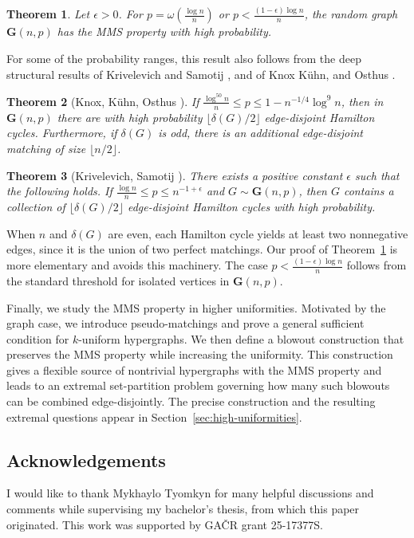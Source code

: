 \documentclass[12pt,UKenglish]{amsart}
\newtheorem{thm}{Theorem}[section]
\theoremstyle{plain}
\theoremstyle{definition}
\theoremstyle{remark}
\begin{document}
\begin{thm}\label{thm:random-graphs}
  Let $\epsilon>0$. For $p = \omega\left({\frac{\log n}{n}}\right)$ or $p<\frac{(1-\epsilon)\log n}{n}$, the random graph $\mathbf{G}(n,p)$ has the MMS property with high probability.
\end{thm}

For some of the probability ranges, this result also follows from the deep structural results of Krivelevich and Samotij \cite{krivelevich2012optimal}, and of Knox K\"uhn, and Osthus \cite{knox2015edge}.
\begin{thm}[Knox, K\"{u}hn, Osthus \cite{knox2015edge}]
  If $\frac{\log^{50}n}n\leq p\leq1-n^{-1/4}\log^9n$, then in $\mathbf{G}(n,p)$ there are with high probability $\lfloor\delta(G)/2\rfloor$ edge-disjoint Hamilton cycles. Furthermore, if $\delta(G)$ is odd, there is an additional edge-disjoint matching of size $\lfloor n/2\rfloor$.
\end{thm}
\begin{thm}[Krivelevich, Samotij \cite{krivelevich2012optimal}]
  There exists a positive constant $\epsilon$ such that the following holds. If
  $\frac{\log n}{n}\leq p\leq n^{-1+\epsilon}$ and $G\sim \mathbf{G}(n, p)$, then $G$ contains a collection of $\lfloor \delta(G)/2\rfloor$ edge-disjoint Hamilton cycles with high probability.
\end{thm}

When $n$ and $\delta(G)$ are even, each Hamilton cycle yields at least two nonnegative edges, since it is the union of two perfect matchings. Our proof of Theorem~\ref{thm:random-graphs} is more elementary and avoids this machinery. The case $p<\frac{(1-\epsilon)\log n}{n}$ follows from the standard threshold for isolated vertices in $\mathbf{G}(n,p)$.

Finally, we study the MMS property in higher uniformities. Motivated by the graph case, we introduce pseudo-matchings and prove a general sufficient condition for $k$-uniform hypergraphs. We then define a blowout construction that preserves the MMS property while increasing the uniformity. This construction gives a flexible source of nontrivial hypergraphs with the MMS property and leads to an extremal set-partition problem governing how many such blowouts can be combined edge-disjointly. The precise construction and the resulting extremal questions appear in Section~\ref{sec:high-uniformities}.
\subsection*{Acknowledgements}
 I would like to thank Mykhaylo Tyomkyn for many helpful discussions and comments while supervising my bachelor's thesis, from which this paper originated. This work was supported by GA\v{C}R grant 25-17377S.
\end{document}
